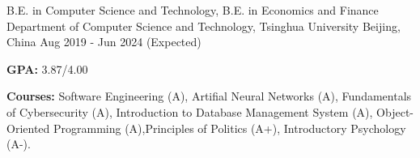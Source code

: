 

\begin{cventries}

  \cventry
    {B.E. in Computer Science and Technology, B.E. in Economics and Finance} %
    {Department of Computer Science and Technology, Tsinghua University} %
    {Beijing, China} %
    {Aug 2019 - Jun 2024 (Expected)} %
    {
      \begin{cvitems} %
        \item {\textbf{GPA:}} 3.87/4.00
        \item {\textbf{Courses:} Software Engineering (A), Artifial Neural Networks (A), Fundamentals of Cybersecurity (A), Introduction to Database Management System (A), Object-Oriented Programming (A),Principles of Politics (A+), Introductory Psychology (A-).}
      \end{cvitems}
    }

\end{cventries}
